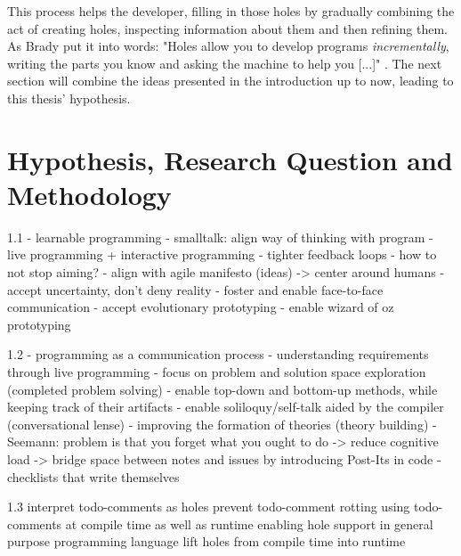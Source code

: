 This process helps the developer, filling in those holes by gradually combining the act of creating holes, inspecting information about them and then refining them.
As Brady put it into words: "Holes allow you to develop programs \emph{incrementally}, writing the parts you know and asking the machine to help you [...]" \cite[pp. 21]{brady_type-driven_2017}.
The next section will combine the ideas presented in the introduction up to now, leading to this thesis' hypothesis.

\section{Hypothesis, Research Question and Methodology}
\label{sec:hypothesis}

1.1
- learnable programming
- smalltalk: align way of thinking with program
- live programming + interactive programming
- tighter feedback loops
- how to not stop aiming?
- align with agile manifesto (ideas) -> center around humans
- accept uncertainty, don't deny reality
- foster and enable face-to-face communication
- accept evolutionary prototyping
- enable wizard of oz prototyping

1.2
- programming as a communication process
- understanding requirements through live programming
- focus on problem and solution space exploration (completed problem solving)
- enable top-down and bottom-up methods, while keeping track of their artifacts
- enable soliloquy/self-talk aided by the compiler (conversational lense)
- improving the formation of theories (theory building)
- Seemann: problem is that you forget what you ought to do -> reduce cognitive load -> bridge space between notes and issues by introducing Post-Its in code
- checklists that write themselves

1.3
interpret todo-comments as holes
prevent todo-comment rotting
using todo-comments at compile time as well as runtime
enabling hole support in general purpose programming language
lift holes from compile time into runtime